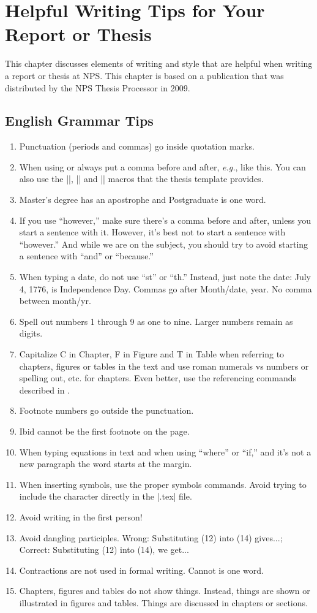 \chapter{Helpful Writing Tips for Your Report or Thesis}
This chapter discusses elements of writing and style that are helpful
when writing a report or thesis at NPS. This chapter is based on a
publication that was distributed by the NPS Thesis Processor in 2009.

\section{English Grammar Tips}
\begin{enumerate}
\item Punctuation (periods and commas) go inside quotation marks. 
\item When using \ie \eg or \etc always put
  a comma before and after, \emph{e.g.}, like this. You can also use
  the |\ie|, |\eg| and |\etc| macros that the thesis template provides.
\item Master's degree has an apostrophe and Postgraduate is one word. 
\item If you use ``however,'' make sure there's a comma before and after,
  unless you start a sentence with it. However, it's best not to start a sentence
  with ``however.'' And while we are on the subject, you should try to avoid 
  starting a sentence with ``and'' or ``because.'' 
\item When typing a date, do not use ``st'' or ``th.'' Instead, just
  note the date: July 4, 1776, is Independence Day. Commas go 
  after Month/date, year. No comma between month/yr. 
\item Spell out numbers 1 through 9 as one to nine.  Larger numbers remain as digits.  
\item Capitalize C in Chapter, F in Figure and T in Table when
  referring to chapters, figures or tables in the text and use roman
  numerals vs numbers or spelling out, etc. for chapters. Even
  better, use the referencing commands described in .
\item Footnote numbers go outside the punctuation. 
\item Ibid cannot be the first footnote on the page.
\item When typing equations in text and when using ``where'' or ``if,''
  \etc and it's not a new paragraph the word starts at the margin.
\item When inserting symbols, use the proper symbols commands.  Avoid trying to
  include the character directly in the |.tex| file.
\item Avoid writing in the first person!
\item Avoid dangling participles.  Wrong: Substituting (12) into (14) gives...;
  Correct: Substituting (12) into (14), we get...
\item Contractions are not used in formal writing.  Cannot is one word.
\item Chapters, figures and tables do not show things.  Instead, things are shown
  or illustrated in figures and tables.  Things are discussed in chapters or sections.
\end{enumerate}

